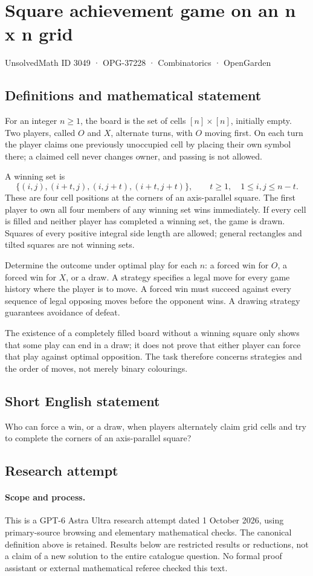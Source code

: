 \documentclass[11pt,a4paper]{article}
\begin{document}
\section*{Square achievement game on an n x n grid}\label{3049}
{\small UnsolvedMath ID 3049 · OPG-37228 · Combinatorics · OpenGarden}
\subsection{Definitions and mathematical statement}
For an integer $n\ge1$, the board is the set of cells
$[n]\times[n]$, initially empty. Two players, called $O$ and $X$, alternate
turns, with $O$ moving first. On each turn the player claims one previously
unoccupied cell by placing their own symbol there; a claimed cell never
changes owner, and passing is not allowed.

A winning set is
\[
 \{(i,j),(i+t,j),(i,j+t),(i+t,j+t)\},
 \qquad t\ge1,\quad 1\le i,j\le n-t.
\]
These are four cell positions at the corners of an axis-parallel square.
The first player to own all four members of any winning set wins immediately.
If every cell is filled and neither player has completed a winning set,
the game is drawn. Squares of every positive integral side length are
allowed; general rectangles and tilted squares are not winning sets.

Determine the outcome under optimal play for each $n$: a forced win for
$O$, a forced win for $X$, or a draw. A strategy specifies a legal move
for every game history where the player is to move. A forced win must
succeed against every sequence of legal opposing moves before the opponent
wins. A drawing strategy guarantees avoidance of defeat.

The existence of a completely filled board without a winning square only
shows that some play can end in a draw; it does not prove that either
player can force that play against optimal opposition. The task therefore
concerns strategies and the order of moves, not merely binary colourings.
\subsection{Short English statement}
Who can force a win, or a draw, when players alternately claim grid cells and try to complete the corners of an axis-parallel square?
\subsection{Research attempt}
\paragraph{Scope and process.}
This is a GPT-6 Astra Ultra research attempt dated 1 October 2026, using
primary-source browsing and elementary mathematical checks. The canonical
definition above is retained. Results below are restricted results or
reductions, not a claim of a new solution to the entire catalogue question.
No formal proof assistant or external mathematical referee checked this text.
\end{document}
